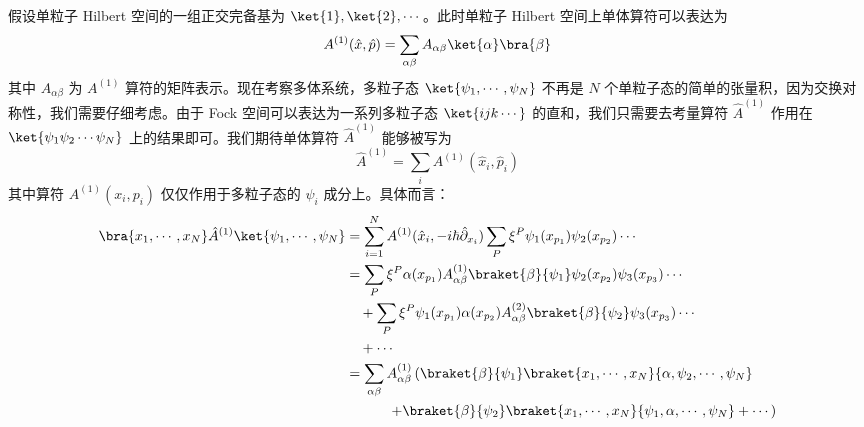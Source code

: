 假设单粒子 Hilbert 空间的一组正交完备基为 $\ket{1},\ket{2},\cdots$。此时单粒子 Hilbert 空间上单体算符可以表达为
\begin{equation}
A^{(1)}(\hat x,\hat p)=\sum_{\alpha\beta}A_{\alpha\beta} \ket{\alpha}\bra{\beta}
\end{equation}
其中 $A_{\alpha\beta}$ 为 $A^{(1)}$ 算符的矩阵表示。现在考察多体系统，多粒子态 $\ket{\psi_1,\cdots,\psi_N}$ 不再是 $N$ 个单粒子态的简单的张量积，因为交换对称性，我们需要仔细考虑。由于 Fock 空间可以表达为一系列多粒子态 $\ket{ijk\cdots}$ 的直和，我们只需要去考量算符 $\hat A^{(1)}$ 作用在 $\ket{\psi_1 \psi_2 \cdots\psi_N}$ 上的结果即可。我们期待单体算符 $\hat A^{(1)}$ 能够被写为
\begin{equation}
\hat A^{(1)}=\sum_{i} A^{(1)}(\hat x_i,\hat p_i)
\end{equation}
其中算符 $A^{(1)}(x_i,p_i)$ 仅仅作用于多粒子态的 $\psi_i$ 成分上。具体而言：
\begin{equation}
\begin{aligned}
\bra{x_1,\cdots,x_N}\hat A^{(1)} \ket{\psi_1,\cdots,\psi_N}&=\sum_{i=1}^N A^{(1)}(\hat x_i,-i\hbar\hat\partial_{x_i})\sum_{P} \xi^P \psi_1(x_{p_1})\psi_2(x_{p_2})\cdots\\
&=\sum_{P}\xi^P \alpha(x_{p_1})A_{\alpha\beta}^{(1)}\braket{\beta}{\psi_1}\psi_2(x_{p_2})\psi_3(x_{p_3})\cdots\\
&\quad +\sum_P\xi^P \psi_1(x_{p_1})\alpha(x_{p_2})A_{\alpha\beta}^{(2)}\braket{\beta}{\psi_2}\psi_3(x_{p_3})\cdots\\
&\quad +\cdots \\
&=\sum_{\alpha\beta} A_{\alpha\beta}^{(1)}\left(\braket{\beta}{\psi_1} \braket{x_1,\cdots,x_N}{\alpha,\psi_2,\cdots,\psi_N}\right.\\
&\left.\quad \quad\quad+\braket{\beta}{\psi_2}\braket{x_1,\cdots,x_N}{\psi_1,\alpha,\cdots,\psi_N}+\cdots\right)
\end{aligned}
\end{equation}
